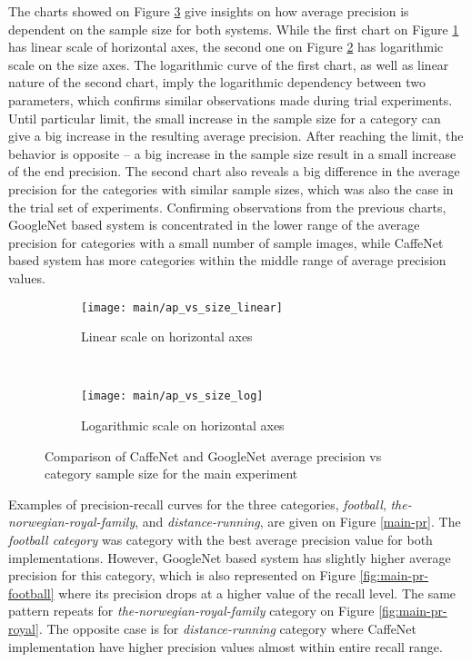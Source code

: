     The charts showed on Figure \ref{fig:main-ap-vs-size} give insights on how average precision is dependent on the sample size for both systems. While the first chart on Figure \ref{fig:main-ap-vs-size-linear} has linear scale of horizontal axes, the second one on Figure \ref{fig:main-ap-vs-size-log} has logarithmic scale on the size axes. The logarithmic curve of the first chart, as well as linear nature of the second chart, imply the logarithmic dependency between two parameters, which confirms similar observations made during trial experiments. Until particular limit, the small increase in the sample size for a category can give a big increase in the resulting average precision. After reaching the limit, the behavior is opposite -- a big increase in the sample size result in a small increase of the end precision. The second chart also reveals a big difference in the average precision for the categories with similar sample sizes, which was also the case in the trial set of experiments. Confirming observations from the previous charts, GoogleNet based system is concentrated in the lower range of the average precision for categories with a small number of sample images, while CaffeNet based system has more categories within the middle range of average precision values.
    
    \begin{figure}[H]
        \centering
        \begin{subfigure}[a]{\textwidth}
            \texttt{[image: main/ap\_vs\_size\_linear]}
            \caption{Linear scale on horizontal axes}
            \label{fig:main-ap-vs-size-linear}
        \end{subfigure}
        \\
        \begin{subfigure}[a]{\textwidth}
            \texttt{[image: main/ap\_vs\_size\_log]}
            \caption{Logarithmic scale on horizontal axes}
            \label{fig:main-ap-vs-size-log}
        \end{subfigure}
        \caption{Comparison of CaffeNet and GoogleNet average precision vs category sample size for the main experiment}
        \label{fig:main-ap-vs-size}
    \end{figure}
    
    Examples of precision-recall curves for the three categories, \textit{football}, \textit{the-norwegian-royal-family}, and \textit{distance-running}, are given on Figure \ref{main-pr}. The \textit{football category} was category with the best average precision value for both implementations. However, GoogleNet based system has slightly higher average precision for this category, which is also represented on Figure \ref{fig:main-pr-football} where its precision drops at a higher value of the recall level. The same pattern repeats for \textit{the-norwegian-royal-family} category on Figure \ref{fig:main-pr-royal}. The opposite case is for \textit{distance-running} category where CaffeNet implementation have higher precision values almost within entire recall range.
    
